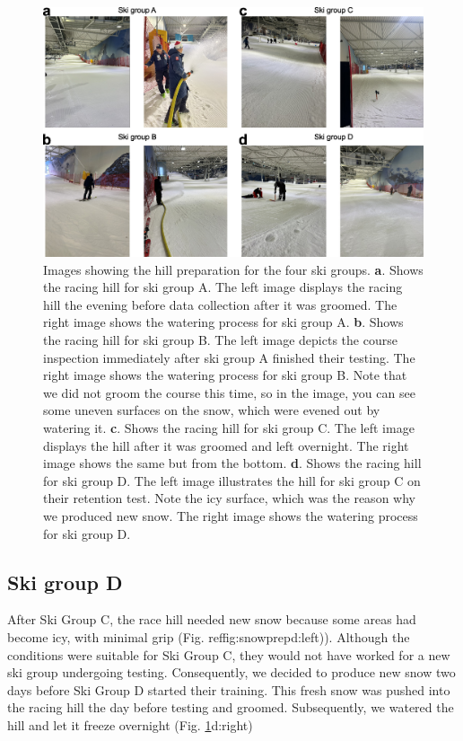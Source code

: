 \documentclass[pdflatex,sn-mathphys-num]{sn-jnl}%
\theoremstyle{thmstyleone}%
\theoremstyle{thmstyletwo}%
\theoremstyle{thmstylethree}%
\begin{document}
\begin{appendices}
\begin{figure}[H]
\centering
\includegraphics[width=\linewidth]{figures/figure_appendix_snowprep.jpg}
\caption{Images showing the hill preparation for the four ski groups. \textbf{a}. Shows the racing hill for ski group A. The left image displays the racing hill the evening before data collection after it was groomed. The right image shows the watering process for ski group A. \textbf{b}. Shows the racing hill for ski group B. The left image depicts the course inspection immediately after ski group A finished their testing. The right image shows the watering process for ski group B. Note that we did not groom the course this time, so in the image, you can see some uneven surfaces on the snow, which were evened out by watering it. \textbf{c}. Shows the racing hill for ski group C. The left image displays the hill after it was groomed and left overnight. The right image shows the same but from the bottom. \textbf{d}. Shows the racing hill for ski group D. The left image illustrates the hill for ski group C on their retention test. Note the icy surface, which was the reason why we produced new snow. The right image shows the watering process for ski group D. 
}
\label{fig:snowprep}
\end{figure}
 
\subsection*{Ski group D}
After Ski Group C, the race hill needed new snow because some areas had become icy, with minimal grip (Fig. ref{fig:snowprep}d:left)). Although the conditions were suitable for Ski Group C, they would not have worked for a new ski group undergoing testing. Consequently, we decided to produce new snow two days before Ski Group D started their training. This fresh snow was pushed into the racing hill the day before testing and groomed. Subsequently, we watered the hill and let it freeze overnight (Fig. \ref{fig:snowprep}d:right)




\end{appendices}
\end{document}
